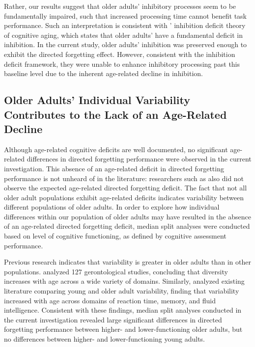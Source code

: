 \documentclass[man]{apa6}\usepackage[]{graphicx}\usepackage[]{color}
\begin{document}
Rather, our results suggest that older adults’ inhibitory processes seem to be fundamentally impaired, such that increased processing time cannot benefit task performance. Such an interpretation is consistent with \textcite{hasher.zacks1988}' inhibition deficit theory of cognitive aging, which states that older adults’ have a fundamental deficit in inhibition. In the current study, older adults’ inhibition was preserved enough to exhibit the directed forgetting effect. However, consistent with the inhibition deficit framework, they were unable to enhance inhibitory processing past this baseline level due to the inherent age-related decline in inhibition.

\subsection*{Older Adults’ Individual Variability Contributes to the Lack of an Age-Related Decline}

Although age-related cognitive deficits are well documented, no significant age-related differences in directed forgetting performance were observed in the current investigation. This absence of an age-related deficit in directed forgetting performance is not unheard of in the literature: researchers such as \textcite{gamboz.russo2002} also did not observe the expected age-related directed forgetting deficit. The fact that not all older adult populations exhibit age-related deficits indicates variability between different populations of older adults. In order to explore how individual differences within our population of older adults may have resulted in the absence of an age-related directed forgetting deficit, median split analyses were conducted based on level of cognitive functioning, as defined by cognitive assessment performance.

Previous research indicates that variability is greater in older adults than in other populations. \textcite{nelson.dannefer1992} analyzed 127 gerontological studies, concluding that diversity increases with age across a wide variety of domains. Similarly, \textcite{morse1993} analyzed existing literature comparing young and older adult variability, finding that variability increased with age across domains of reaction time, memory, and fluid intelligence. Consistent with these findings, median split analyses conducted in the current investigation revealed large significant differences in directed forgetting performance between higher- and lower-functioning older adults, but no differences between higher- and lower-functioning young adults.
\end{document}
